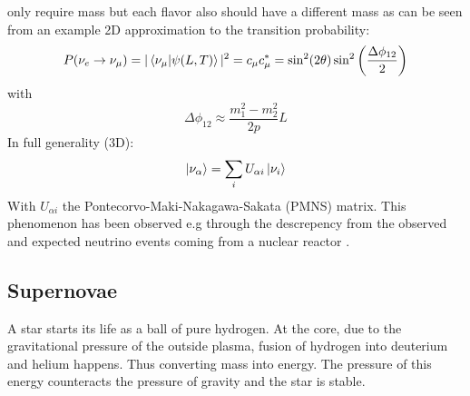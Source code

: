 \documentclass[11pt,a4paper,faculty=we,language=en,doctype=report]{cls/ugent-doc}
\begin{document}
only require mass but each flavor also should have a different mass as can be seen
from an example 2D approximation to the transition probability:
\begin{equation}
	P(\nu_e\rightarrow\nu_\mu) = |\braket{\nu_\mu|\psi(L,T)}|^2 = c_\mu c_\mu^* = \sin ^2(2 \theta) \sin ^2\left(\frac{\Delta \phi_{12}}{2}\right)
\end{equation}
with
\begin{equation}
	\Delta \phi_{12} \approx \frac{m_1^2 - m_2^2}{2p}L
\end{equation}
In full generality (3D):
\begin{equation}
	\ket{\nu_\alpha} = \sum_iU_{\alpha i} \ket{\nu_i}
\end{equation}
With $U_{\alpha i}$ the Pontecorvo-Maki-Nakagawa-Sakata (PMNS) matrix. 
This phenomenon has been observed e.g through the descrepency from the observed
and expected neutrino events coming from a nuclear reactor \cite{Eguchi_2003}.
\subsection{Supernovae}
\label{sec:supernovae}
A star starts its life as a ball of pure hydrogen. At the core, due to the
gravitational pressure of the outside plasma, fusion of hydrogen into deuterium
and helium happens. Thus converting mass into energy. The pressure of this energy
counteracts the pressure of gravity and the star is stable.
\end{document}
